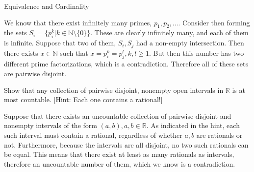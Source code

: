 \begin{section}{Equivalence and Cardinality}
\begin{solution}
    We know that there exist infinitely many primes, $p_1, p_2, \ldots$. 
    Consider then forming the sets $S_i = \{p_i^k \lvert k \in \mathbb{N} \setminus \{0\}\}$.
    These are clearly infinitely many, and each of them is infinite.
    Suppose that two of them, $S_i, S_j$ had a non-empty intersection.
    Then there exists $x \in \mathbb{N}$ such that $x = p_i^k = p_j^l, k, l \geq 1$.
    But then this number has two different prime factorizations, which is a contradiction.
    Therefore all of these sets are pairwise disjoint.
\end{solution}

\begin{exercise}{15}
    Show that any collection of pairwise disjoint, nonempty open intervals in $\mathbb{R}$ is at most countable. [Hint: Each one contains a rational!]
\end{exercise}

\begin{solution}

    Suppose that there exists an uncountable collection of pairwise disjoint and nonempty intervals of the form $(a, b), a, b \in \mathbb{R}$.
    As indicated in the hint, each such interval must contain a rational, regardless of whether $a, b$ are rationals or not.
    Furthermore, because the intervals are all disjoint, no two such rationals can be equal.
    This means that there exist at least as many rationals as intervals, therefore an uncountable number of them, which we know is a contradiction.
\end{solution}

\end{section}

